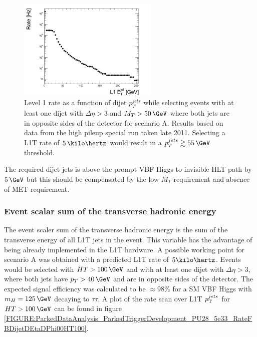 \begin{figure}[!htb]
\centering
\includegraphics[width=0.60\textwidth]{Chapter06/Trigger/Images/PU28_5e33_RateFBDijetDEtaDPhi00MT50.png}
\caption[Level 1 rate as a function of dijet $p_T^{jets}$ while selecting events with at least one dijet with $\Delta\eta>3$ and $M_{T}>50\,\GeV$ where both jets are in opposite sides of the detector for scenario A.]
{Level 1 rate as a function of dijet $p_T^{jets}$ while selecting events with at least one dijet with $\Delta\eta>3$ and $M_{T}>50\,\GeV$ where both jets are in opposite sides of the detector for scenario A. Results based on data from the high pileup special run taken late 2011. Selecting a \gls{L1T} rate of $5\,\kilo\hertz$ would result in a $p_T^{jets} \gtrsim 55\,\GeV$ threshold.}
\label{FIGURE:ParkedDataAnalysis_ParkedTriggerDevelopment_PU28_5e33_RateFBDijetDEtaDPhi00MT50} 
\end{figure}

The required dijet jets \pt is above the prompt \gls{VBF} Higgs to invisible \gls{HLT} path by $5\,\GeV$ but this should be compensated by the low $M_{T}$ requirement and absence of \gls{MET} requirement.

\subsubsection{Event scalar sum of the transverse hadronic energy}


The event scaler sum of the transverse hadronic energy is the sum of the transverse energy of all \gls{L1T} jets in the event. This variable has the advantage of being already implemented in the \gls{L1T} hardware. A possible working point for scenario A was obtained with a predicted \gls{L1T} rate of $5\kilo\hertz$. Events would be selected with $HT>100\,\GeV$ and with at least one dijet with $\Delta\eta>3$, where both jets have $p_T>40\,\GeV$ and are in opposite sides of the detector. The expected signal efficiency was calculated to be $\approx 98\%$ for a \gls{SM} \gls{VBF} Higgs with $m_H=125\,\GeV$ decaying to $\tau\tau$. A plot of the rate scan over \gls{L1T} $p_{\mathrm{T}}^{jets}$ for $HT>100\,\GeV$ can be found in figure \ref{FIGURE:ParkedDataAnalysis_ParkedTriggerDevelopment_PU28_5e33_RateFBDijetDEtaDPhi00HT100}.

